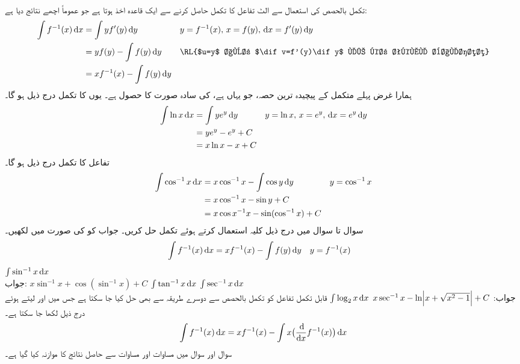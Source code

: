 \\
تکمل بالحصص کی استعمال سے الٹ تفاعل کا تکمل حاصل کرنے سے ایک قاعدہ اخذ ہوتا ہے جو عموماً اچھے نتائج دیا ہے:
\begin{align*}
\int f^{-1}(x)\dif x&=\int yf'(y)\dif y&&y=f^{-1}(x),\, x=f(y),\, \dif x=f'(y)\dif y\\
&=yf(y)-\int f(y)\dif y&&\text{\RL{$u=y$ اور $\dif v=f'(y)\dif y$ لے کر تکمل بالحصص}}\\
&=xf^{-1}(x)-\int f(y)\dif y
\end{align*} 
ہمارا غرض پہلے متکمل کے پیچیدہ ترین حصہ، جو یہاں  ہے، کی سادہ صورت کا حصول ہے۔ یوں   کا تکمل درج ذیل ہو گا۔
\begin{align*}
\int \ln x\dif x&=\int ye^y\dif y&&y=\ln x,\, x=e^y,\, \dif x=e^y\dif y\\
&=ye^y-e^y+C\\
&=x\ln x-x+C
\end{align*}
تفاعل  کا تکمل درج ذیل ہو گا۔
\begin{align*}
\int \cos^{-1}x\dif x&=x\cos^{-1}x-\int \cos y\dif y&&y=\cos^{-1}x\\
&=x\cos^{-1}x-\sin y+C\\
&=x\cos x^{-1}x-\sin(\cos^{-1}x)+C
\end{align*}
سوال  تا سوال  میں درج ذیل کلیہ 
 استعمال کرتے ہوئے تکمل حل کریں۔ جواب کو  کی صورت میں لکھیں۔
\begin{align}\label{مساوات_طریقہ_قاعدہ_الٹ_تفاعل_تکمل_الف}
\int f^{-1}(x)\dif x&=xf^{-1}(x)-\int f(y)\dif y&&y=f^{-1}(x)
\end{align}
$\int \sin^{-1}x\dif x$\\
جواب:\quad
$x\sin^{-1}x+\cos(\sin^{-1}x)+C$
$\int \tan^{-1}x\dif x$
$\int \sec^{-1}x\dif x$\\
جواب:\quad
$x\sec^{-1}x-\ln\abs{x+\sqrt{x^2-1}}+C$
$\int \log_2x\dif x$
قابل تکمل تفاعل  کو تکمل بالحصص سے دوسرے طریقہ سے بھی حل کیا جا سکتا ہے جس میں  اور  لیتے ہوئے درج ذیل لکھا جا سکتا ہے۔
\begin{align}\label{مساوات_طریقہ_قاعدہ_الٹ_تفاعل_تکمل_ب}
\int f^{-1}(x)\dif x=xf^{-1}(x)-\int x\big(\frac{\dif}{\dif x}f^{-1}(x)\big)\dif x
\end{align}
سوال اور سوال  میں مساوات  اور مساوات   سے حاصل نتائج کا موازنہ کیا گیا ہے۔


